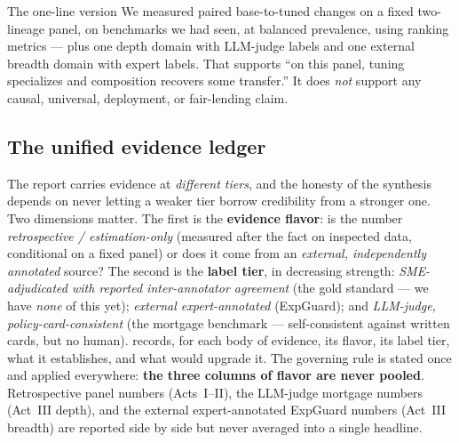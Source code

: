\begin{takeaway}{The one-line version}
We measured paired base-to-tuned changes on a fixed two-lineage panel, on benchmarks we had seen, at balanced prevalence, using ranking metrics --- plus one depth domain with LLM-judge labels and one external breadth domain with expert labels. That supports ``on this panel, tuning specializes and composition recovers some transfer.'' It does \emph{not} support any causal, universal, deployment, or fair-lending claim.
\end{takeaway}

\subsection{The unified evidence ledger}
\label{sec:ledger}

The report carries evidence at \emph{different tiers}, and the honesty of the synthesis depends on never letting a weaker tier borrow credibility from a stronger one. Two dimensions matter. The first is the \textbf{evidence flavor}: is the number \emph{retrospective / estimation-only} (measured after the fact on inspected data, conditional on a fixed panel) or does it come from an \emph{external, independently annotated} source? The second is the \textbf{label tier}, in decreasing strength: \emph{SME-adjudicated with reported inter-annotator agreement} (the gold standard --- we have \emph{none} of this yet); \emph{external expert-annotated} (ExpGuard); and \emph{LLM-judge, policy-card-consistent} (the mortgage benchmark --- self-consistent against written cards, but no human).  records, for each body of evidence, its flavor, its label tier, what it establishes, and what would upgrade it. The governing rule is stated once and applied everywhere: \textbf{the three columns of flavor are never pooled}. Retrospective panel numbers (Acts~I--II), the LLM-judge mortgage numbers (Act~III depth), and the external expert-annotated ExpGuard numbers (Act~III breadth) are reported side by side but never averaged into a single headline.

